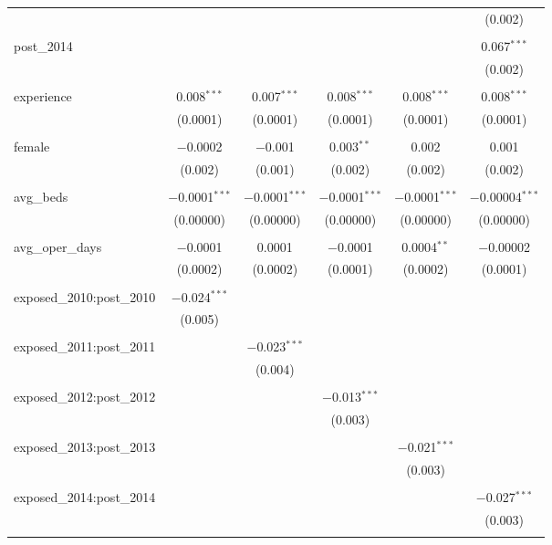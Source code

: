 \begin{table}[!htbp]
\begin{tabular}{@{\extracolsep{5pt}}lccccc}
  &  &  &  &  & (0.002) \\ 
  & & & & & \\ 
 post\_2014 &  &  &  &  & 0.067$^{***}$ \\ 
  &  &  &  &  & (0.002) \\ 
  & & & & & \\ 
 experience & 0.008$^{***}$ & 0.007$^{***}$ & 0.008$^{***}$ & 0.008$^{***}$ & 0.008$^{***}$ \\ 
  & (0.0001) & (0.0001) & (0.0001) & (0.0001) & (0.0001) \\ 
  & & & & & \\ 
 female & $-$0.0002 & $-$0.001 & 0.003$^{**}$ & 0.002 & 0.001 \\ 
  & (0.002) & (0.001) & (0.002) & (0.002) & (0.002) \\ 
  & & & & & \\ 
 avg\_beds & $-$0.0001$^{***}$ & $-$0.0001$^{***}$ & $-$0.0001$^{***}$ & $-$0.0001$^{***}$ & $-$0.00004$^{***}$ \\ 
  & (0.00000) & (0.00000) & (0.00000) & (0.00000) & (0.00000) \\ 
  & & & & & \\ 
 avg\_oper\_days & $-$0.0001 & 0.0001 & $-$0.0001 & 0.0004$^{**}$ & $-$0.00002 \\ 
  & (0.0002) & (0.0002) & (0.0001) & (0.0002) & (0.0001) \\ 
  & & & & & \\ 
 exposed\_2010:post\_2010 & $-$0.024$^{***}$ &  &  &  &  \\ 
  & (0.005) &  &  &  &  \\ 
  & & & & & \\ 
 exposed\_2011:post\_2011 &  & $-$0.023$^{***}$ &  &  &  \\ 
  &  & (0.004) &  &  &  \\ 
  & & & & & \\ 
 exposed\_2012:post\_2012 &  &  & $-$0.013$^{***}$ &  &  \\ 
  &  &  & (0.003) &  &  \\ 
  & & & & & \\ 
 exposed\_2013:post\_2013 &  &  &  & $-$0.021$^{***}$ &  \\ 
  &  &  &  & (0.003) &  \\ 
  & & & & & \\ 
 exposed\_2014:post\_2014 &  &  &  &  & $-$0.027$^{***}$ \\ 
  &  &  &  &  & (0.003) \\ 
  & & & & & \\ 

\end{tabular}
\end{table}
